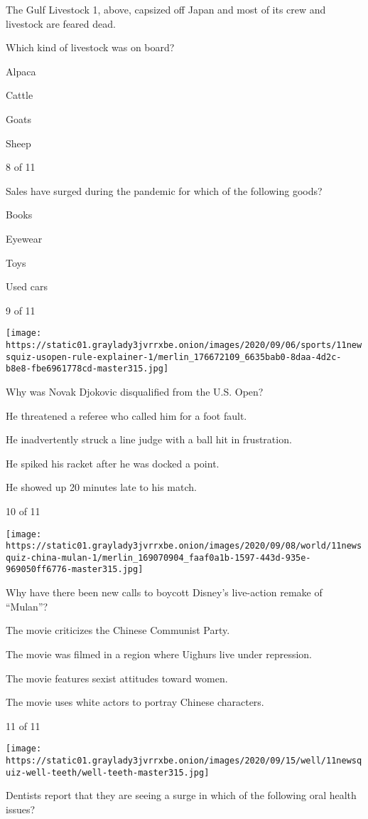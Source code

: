 The Gulf Livestock 1, above, capsized off Japan and most of its crew and
livestock are feared dead.

Which kind of livestock was on board?

Alpaca

Cattle

Goats

Sheep

8 of 11

Sales have surged during the pandemic for which of the following goods?

Books

Eyewear

Toys

Used cars

9 of 11

\texttt{[image: https://static01.graylady3jvrrxbe.onion/images/2020/09/06/sports/11newsquiz-usopen-rule-explainer-1/merlin\_176672109\_6635bab0-8daa-4d2c-b8e8-fbe6961778cd-master315.jpg]}

Why was Novak Djokovic disqualified from the U.S. Open?

He threatened a referee who called him for a foot fault.

He inadvertently struck a line judge with a ball hit in frustration.

He spiked his racket after he was docked a point.

He showed up 20 minutes late to his match.

10 of 11

\texttt{[image: https://static01.graylady3jvrrxbe.onion/images/2020/09/08/world/11newsquiz-china-mulan-1/merlin\_169070904\_faaf0a1b-1597-443d-935e-969050ff6776-master315.jpg]}

Why have there been new calls to boycott Disney's live-action remake of
``Mulan''?

The movie criticizes the Chinese Communist Party.

The movie was filmed in a region where Uighurs live under repression.

The movie features sexist attitudes toward women.

The movie uses white actors to portray Chinese characters.

11 of 11

\texttt{[image: https://static01.graylady3jvrrxbe.onion/images/2020/09/15/well/11newsquiz-well-teeth/well-teeth-master315.jpg]}

Dentists report that they are seeing a surge in which of the following
oral health issues?

